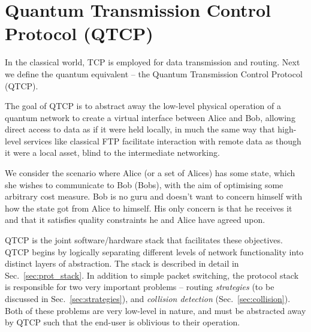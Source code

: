 \documentclass[aps, rmp, twocolumn, amsmath, amssymb, nofootinbib, superscriptaddress, longbibliography, floatfix, table-of-contents, eqsecnum]{revtex4-1}
\begin{document}
%
%

\section{Quantum Transmission Control Protocol (QTCP)} \label{sec:QTCP}

In the classical world, TCP is employed for data transmission and routing. Next we define the quantum equivalent -- the Quantum Transmission Control Protocol (QTCP).

The goal of QTCP is to abstract away the low-level physical operation of a quantum network to create a virtual interface between Alice and Bob, allowing direct access to data as if it were held locally, in much the same way that high-level services like classical FTP facilitate interaction with remote data as though it were a local asset, blind to the intermediate networking.

We consider the scenario where Alice (or a set of Alices) has some state, which she wishes to communicate to Bob (Bobs), with the aim of optimising some arbitrary cost measure. Bob is no guru and doesn't want to concern himself with how the state got from Alice to himself. His only concern is that he receives it and that it satisfies quality constraints he and Alice have agreed upon.

QTCP is the joint software/hardware stack that facilitates these objectives. QTCP begins by logically separating different levels of network functionality into distinct layers of abstraction. The stack is described in detail in Sec.~\ref{sec:prot_stack}. In addition to simple packet switching, the protocol stack is responsible for two very important problems -- routing \textit{strategies} (to be discussed in Sec.~\ref{sec:strategies}), and \textit{collision detection} (Sec.~\ref{sec:collision}). Both of these problems are very low-level in nature, and must be abstracted away by QTCP such that the end-user is oblivious to their operation.
\end{document}
